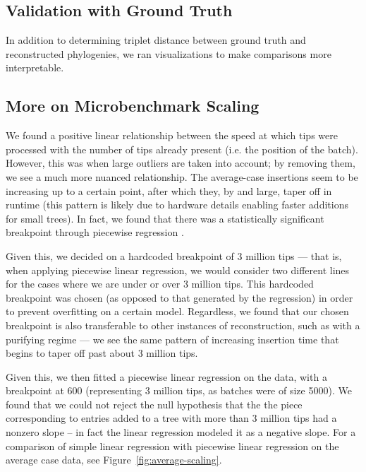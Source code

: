 \subsection{Validation with Ground Truth}

In addition to determining triplet distance between ground truth and reconstructed phylogenies, we ran visualizations to make comparisons more interpretable.



\subsection{More on Microbenchmark Scaling}

We found a positive linear relationship between the speed at which tips were processed with the number of tips already present (i.e. the position of the batch).
However, this was when large outliers are taken into account; by removing them, we see a much more nuanced relationship.
The average-case insertions seem to be increasing up to a certain point, after which they, by and large, taper off in runtime (this pattern is likely due to hardware details enabling faster additions for small trees).
In fact, we found that there was a statistically significant breakpoint through piecewise regression \citep{pilgrim2021piecewise,davies1987hypothesis}.

Given this, we decided on a hardcoded breakpoint of 3 million tips --- that is, when applying piecewise linear regression, we would consider two different lines for the cases where we are under or over 3 million tips.
This hardcoded breakpoint was chosen (as opposed to that generated by the regression) in order to prevent overfitting on a certain model.
Regardless, we found that our chosen breakpoint is also transferable to other instances of reconstruction, such as with a purifying regime --- we see the same pattern of increasing insertion time that begins to taper off past about 3 million tips.

Given this, we then fitted a piecewise linear regression on the data, with a breakpoint at 600 (representing 3 million tips, as batches were of size 5000).
We found that we could not reject the null hypothesis that the the piece corresponding to entries added to a tree with more than 3 million tips had a nonzero slope -- in fact the linear regression modeled it as a negative slope.
For a comparison of simple linear regression with piecewise linear regression on the average case data, see Figure~\ref{fig:average-scaling}.

